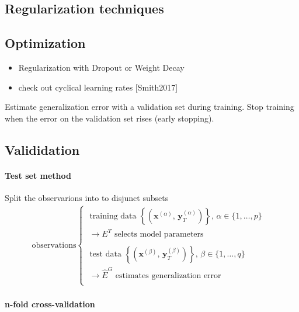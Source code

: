 \documentclass{article}
\begin{document}
\subsection{Regularization techniques}


\subsection{Optimization}

\begin{itemize}
\item Regularization with Dropout or Weight Decay
\item check out cyclical learning rates \cite{Smith2017}[Smith2017]
\end{itemize}


Estimate generalization error with a validation set during training. Stop training when the error on the validation set rises (early stopping).

\subsection{Valididation}

\paragraph{Test set method} Split the observarions into to disjunct subsets 
\begin{align*}
\text{observations}
\begin{cases}
	\text{ training data } \left\{ \left(\mathbf x^{(\alpha)}, \,\mathbf y_T^{(\alpha)}\right) \right \}, \, \alpha \in \{1,\dots, p\} & \\	
	\;\rightarrow E^T \text{ selects model parameters} & \\	 \\
	\text{ test data } \left\{ \left(\mathbf x^{(\beta)}, \,\mathbf y_T^{(\beta)}\right) \right \}, \, \beta \in \{1,\dots, q\} & \\	
	\;\rightarrow \widehat{E}^G \text{ estimates generalization error} & \\	
\end{cases}
\end{align*} 

\paragraph{n-fold cross-validation} 
\end{document}
